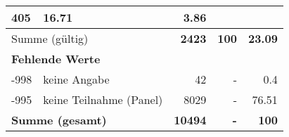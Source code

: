 \begin{longtable}{lXrrr}
       \num{405} &
       \num[round-mode=places,round-precision=2]{16.71} &
         \num[round-mode=places,round-precision=2]{3.86} \\
     \midrule
     \multicolumn{2}{l}{Summe (gültig)} &
       \textbf{\num{2423}} &
     \textbf{\num{100}} &
       \textbf{\num[round-mode=places,round-precision=2]{23.09}} \\
     \multicolumn{5}{l}{\textbf{Fehlende Werte}}\\
       -998 &
       keine Angabe &
         \num{42} &
        - &
         \num[round-mode=places,round-precision=2]{0.4} \\
       -995 &
       keine Teilnahme (Panel) &
         \num{8029} &
        - &
         \num[round-mode=places,round-precision=2]{76.51} \\
     \midrule
     \multicolumn{2}{l}{\textbf{Summe (gesamt)}} &
          \textbf{\num{10494}} &
        \textbf{-} &
        \textbf{\num{100}} \\
     \bottomrule
     \end{longtable}
     
